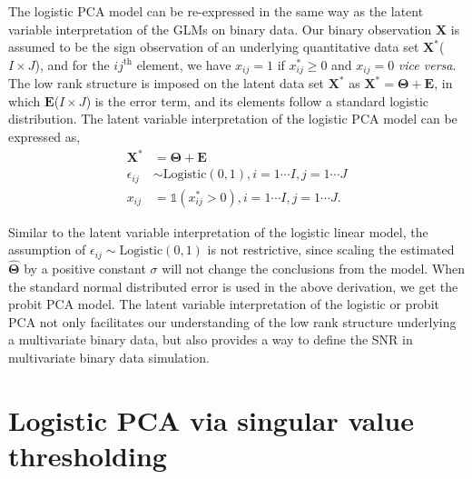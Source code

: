The logistic PCA model can be re-expressed in the same way as the latent variable interpretation of the GLMs on binary data. Our binary observation $\mathbf{X}$ is assumed to be the sign observation of an underlying quantitative data set $\mathbf{X}^{\ast}$($I\times J$), and for the $ij^{\text{th}}$ element, we have $x_{ij} = 1$ if  $x^{\ast}_{ij} \geq 0$ and $x_{ij} = 0$ \textit{vice versa}. The low rank structure is imposed on the latent data set $\mathbf{X}^{\ast}$ as $\mathbf{X}^{\ast} = \mathbf{\Theta} + \mathbf{E}$, in which $\mathbf{E}$($I\times J$) is the error term, and its elements follow a standard logistic distribution. The latent variable interpretation of the logistic PCA model can be expressed as,
\begin{equation*}
\begin{split}
                  \mathbf{X}^{\ast} &= \mathbf{\Theta} + \mathbf{E} \\
                  \epsilon_{ij} & \sim \text{Logistic}(0,1), i = 1 \cdots I, j = 1 \cdots J \\
                  x_{ij} & = \mathbb{1}{(x^{\ast}_{ij}>0)}, i = 1 \cdots I, j = 1 \cdots J.
\end{split}
\end{equation*}

Similar to the latent variable interpretation of the logistic linear model, the assumption of $\epsilon_{ij} \sim \text{Logistic}(0,1)$ is not restrictive, since scaling the estimated $\hat{\mathbf{\Theta}}$ by a positive constant $\sigma$ will not change the conclusions from the model. When the standard normal distributed error is used in the above derivation, we get the probit PCA model. The latent variable interpretation of the logistic or probit PCA not only facilitates our understanding of the low rank structure underlying a multivariate binary data, but also provides a way to define the SNR in multivariate binary data simulation.

\section{Logistic PCA via singular value thresholding}
